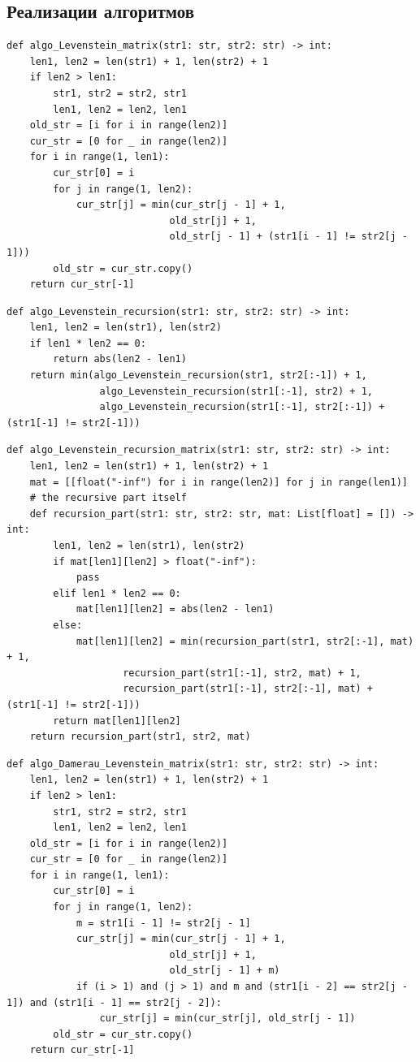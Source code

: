 \subsection{Реализации алгоритмов}
\begin{lstlisting}[caption=реализация матричного алгоритма Левенштейна]
def algo_Levenstein_matrix(str1: str, str2: str) -> int:
    len1, len2 = len(str1) + 1, len(str2) + 1
    if len2 > len1:
        str1, str2 = str2, str1
        len1, len2 = len2, len1
    old_str = [i for i in range(len2)]
    cur_str = [0 for _ in range(len2)]
    for i in range(1, len1):
        cur_str[0] = i
        for j in range(1, len2):
            cur_str[j] = min(cur_str[j - 1] + 1,
                            old_str[j] + 1,
                            old_str[j - 1] + (str1[i - 1] != str2[j - 1]))
        old_str = cur_str.copy()
    return cur_str[-1]
\end{lstlisting}
\begin{lstlisting}[caption=реализация рекурсивного алгоритма Левенштейна]
def algo_Levenstein_recursion(str1: str, str2: str) -> int:
    len1, len2 = len(str1), len(str2)
    if len1 * len2 == 0:
        return abs(len2 - len1)
    return min(algo_Levenstein_recursion(str1, str2[:-1]) + 1,
                algo_Levenstein_recursion(str1[:-1], str2) + 1,
                algo_Levenstein_recursion(str1[:-1], str2[:-1]) + (str1[-1] != str2[-1]))
\end{lstlisting}
\begin{lstlisting}[caption=реализация рекурсивно-матричного алгоритма Левенштейна]
def algo_Levenstein_recursion_matrix(str1: str, str2: str) -> int:
    len1, len2 = len(str1) + 1, len(str2) + 1
    mat = [[float("-inf") for i in range(len2)] for j in range(len1)]
    # the recursive part itself
    def recursion_part(str1: str, str2: str, mat: List[float] = []) -> int:
        len1, len2 = len(str1), len(str2)
        if mat[len1][len2] > float("-inf"):
            pass
        elif len1 * len2 == 0:
            mat[len1][len2] = abs(len2 - len1)
        else:
            mat[len1][len2] = min(recursion_part(str1, str2[:-1], mat) + 1,
                    recursion_part(str1[:-1], str2, mat) + 1,
                    recursion_part(str1[:-1], str2[:-1], mat) + (str1[-1] != str2[-1]))
        return mat[len1][len2]
    return recursion_part(str1, str2, mat)
\end{lstlisting}
\begin{lstlisting}[caption=реализация матричного алгоритма Дамерау-Левенштейна]
def algo_Damerau_Levenstein_matrix(str1: str, str2: str) -> int:
    len1, len2 = len(str1) + 1, len(str2) + 1
    if len2 > len1:
        str1, str2 = str2, str1
        len1, len2 = len2, len1
    old_str = [i for i in range(len2)]
    cur_str = [0 for _ in range(len2)]
    for i in range(1, len1):
        cur_str[0] = i
        for j in range(1, len2):
            m = str1[i - 1] != str2[j - 1]
            cur_str[j] = min(cur_str[j - 1] + 1,
                            old_str[j] + 1,
                            old_str[j - 1] + m)
            if (i > 1) and (j > 1) and m and (str1[i - 2] == str2[j - 1]) and (str1[i - 1] == str2[j - 2]):
                cur_str[j] = min(cur_str[j], old_str[j - 1])
        old_str = cur_str.copy()
    return cur_str[-1]
\end{lstlisting}
